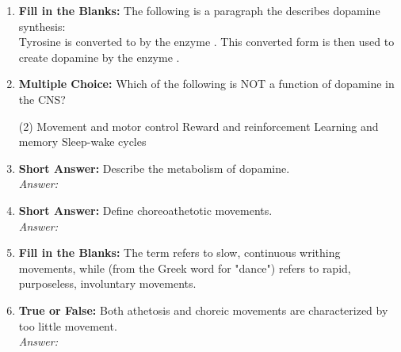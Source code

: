 \begin{enumerate}[label=\textbf{Q3.5.\arabic*}]
    \item \textbf{Fill in the Blanks:} The following is a paragraph the describes dopamine synthesis: \\
    Tyrosine is converted to \underline{\hspace{3cm}} by the enzyme \underline{\hspace{3cm}}. This converted form is then used to create dopamine by the enzyme \underline{\hspace{3cm}}. 
    \item \textbf{Multiple Choice:} Which of the following is NOT a function of dopamine in the CNS?
        \begin{tasks}[label=\textcolor{\documentTheme}{(\Alph*)}, item-format=\color{\documentTheme}, label-width=1.5em, item-indent=1.7em](2)
            \task Movement and motor control
            \task Reward and reinforcement
            \task Learning and memory
            \task Sleep-wake cycles
        \end{tasks}

    \item \textbf{Short Answer:} Describe the metabolism of dopamine. \\ 
        \textit{Answer:} \\ %
        \item \textbf{Short Answer:} Define choreoathetotic movements. \\
        \textit{Answer:} \\%

    \item \textbf{Fill in the Blanks:} The term \underline{\hspace{3cm}} refers to slow, continuous writhing movements, while \underline{\hspace{3cm}} (from the Greek word for "dance") refers to rapid, purposeless, involuntary movements.

    \item \textbf{True or False:} Both athetosis and choreic movements are characterized by too little movement. \\
        \textit{Answer:} %


\end{enumerate}
